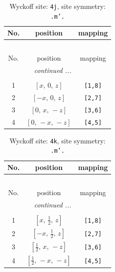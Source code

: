 \documentclass[fleqn,8pt]{jsarticle}
\begin{document}
\renewcommand{\arraystretch}{1.2}
\begin{longtable}{ccc}
\caption{Wyckoff site: {\tt 4j}, site symmetry: {\tt .m'.}}
 \\
 \hline \hline
No. & position & mapping \\ \hline \endfirsthead

\multicolumn{2}{l}{\tablename\ \thetable{}} \\
 \hline \hline
No. & position & mapping \\ \hline \endhead

 \hline \hline
\multicolumn{2}{r}{\footnotesize\it continued ...} \\ \endfoot

 \hline \hline
\multicolumn{2}{r}{} \\ \endlastfoot

1 & $\left[ x,\, 0,\, z \right]$ & {\tt [1,8]} \\ \hline
2 & $\left[ - x,\, 0,\, z \right]$ & {\tt [2,7]} \\ \hline
3 & $\left[ 0,\, x,\, - z \right]$ & {\tt [3,6]} \\ \hline
4 & $\left[ 0,\, - x,\, - z \right]$ & {\tt [4,5]} \\
\end{longtable}
\renewcommand{\arraystretch}{1.2}
\begin{longtable}{ccc}
\caption{Wyckoff site: {\tt 4k}, site symmetry: {\tt .m'.}}
 \\
 \hline \hline
No. & position & mapping \\ \hline \endfirsthead

\multicolumn{2}{l}{\tablename\ \thetable{}} \\
 \hline \hline
No. & position & mapping \\ \hline \endhead

 \hline \hline
\multicolumn{2}{r}{\footnotesize\it continued ...} \\ \endfoot

 \hline \hline
\multicolumn{2}{r}{} \\ \endlastfoot

1 & $\left[ x,\, \frac{1}{2},\, z \right]$ & {\tt [1,8]} \\ \hline
2 & $\left[ - x,\, \frac{1}{2},\, z \right]$ & {\tt [2,7]} \\ \hline
3 & $\left[ \frac{1}{2},\, x,\, - z \right]$ & {\tt [3,6]} \\ \hline
4 & $\left[ \frac{1}{2},\, - x,\, - z \right]$ & {\tt [4,5]} \\
\end{longtable}
\end{document}
